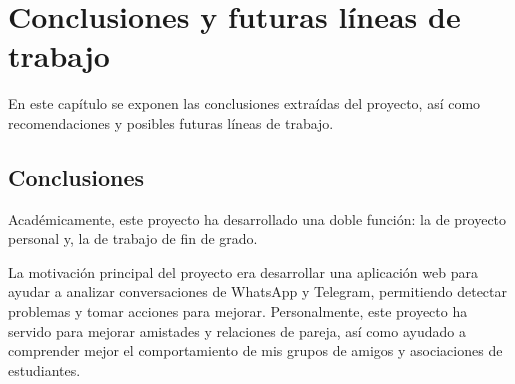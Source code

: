 \chapter{Conclusiones y futuras líneas de trabajo}
\label{chap:conclusions}

En este capítulo se exponen las conclusiones extraídas del proyecto, así como recomendaciones y posibles futuras líneas de trabajo.

\section{Conclusiones}
\label{sec:conclusions}

Académicamente, este proyecto ha desarrollado una doble función: la de proyecto personal y, la de trabajo de fin de grado.

La motivación principal del proyecto era desarrollar una aplicación web para ayudar a analizar conversaciones de WhatsApp y Telegram, permitiendo detectar problemas y tomar acciones para mejorar. Personalmente, este proyecto ha servido para mejorar amistades y relaciones de pareja, así como ayudado a comprender mejor el comportamiento de mis grupos de amigos y asociaciones de estudiantes.


